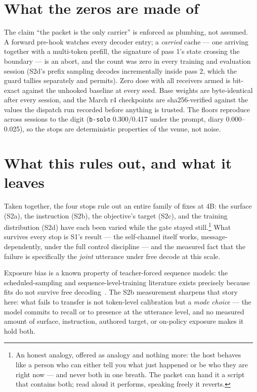 \documentclass[11pt]{article}
\begin{document}
\section{What the zeros are made of}

The claim ``the packet is the only carrier'' is enforced as plumbing, not
assumed.  A forward pre-hook watches every decoder entry; a \emph{carried}
cache --- one arriving together with a multi-token prefill, the signature of
pass 1's state crossing the boundary --- is an abort, and the count was zero
in every training and evaluation session (S2d's prefix sampling decodes
incrementally inside pass 2, which the guard tallies separately and
permits).  Zero dose with all receivers armed is bit-exact against the
unhooked baseline at every seed.  Base weights are byte-identical after
every session, and the March r4 checkpoints are sha256-verified against the
values the dispatch run recorded before anything is trusted.  The floors
reproduce across sessions to the digit (\texttt{b-solo}
0.300/0.417
under the prompt, diary 0.000--0.025), so the stops are deterministic
properties of the venue, not noise.

\section{What this rules out, and what it leaves}

Taken together, the four stops rule out an entire family of fixes at 4B:
the surface (S2a), the instruction (S2b), the objective's target (S2c), and
the training distribution (S2d) have each been varied while the gate stayed
still.\footnote{An honest analogy, offered as analogy and nothing more: the
host behaves like a person who can either tell you what just happened or be
who they are right now --- and never both in one breath.  The packet can
hand it a script that contains both; read aloud it performs, speaking freely
it reverts.}  What survives every stop is S1's result --- the self-channel
itself works, message-dependently, under the full control discipline --- and
the measured fact that the failure is specifically the \emph{joint}
utterance under free decode at this scale.

Exposure bias is a known property of teacher-forced sequence models: the
scheduled-sampling and sequence-level-training literature exists precisely
because fits do not survive free decoding~\cite{bengio2015scheduled,
ranzato2016sequence}.  The S2b measurement sharpens that story here: what
fails to transfer is not token-level calibration but a \emph{mode choice}
--- the model commits to recall or to presence at the utterance level, and
no measured amount of surface, instruction, authored target, or on-policy
exposure makes it hold both.
\end{document}
